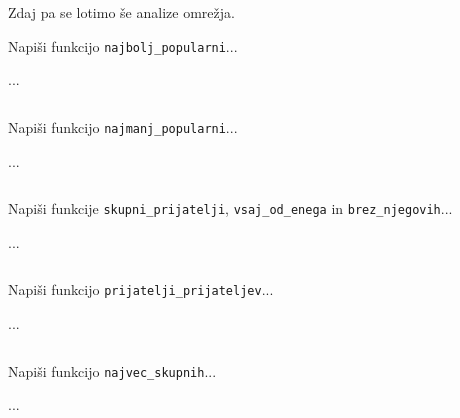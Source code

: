 Zdaj pa se lotimo še analize omrežja.

\begin{zgled}
Napiši funkcijo \texttt{najbolj\_popularni}...
\end{zgled}
\begin{resitev}
...
\begin{lstlisting}[language=Python,numbers=left]

\end{lstlisting}
\end{resitev}

\begin{zgled}
Napiši funkcijo \texttt{najmanj\_popularni}...
\end{zgled}
\begin{resitev}
...
\begin{lstlisting}[language=Python,numbers=left]

\end{lstlisting}
\end{resitev}

\begin{zgled}
Napiši funkcije \texttt{skupni\_prijatelji}, \texttt{vsaj\_od\_enega} in \texttt{brez\_njegovih}...
\end{zgled}
\begin{resitev}
...
\begin{lstlisting}[language=Python,numbers=left]

\end{lstlisting}
\end{resitev}


\begin{zgled}
Napiši funkcijo \texttt{prijatelji\_prijateljev}...
\end{zgled}
\begin{resitev}
...
\begin{lstlisting}[language=Python,numbers=left]

\end{lstlisting}
\end{resitev}


\begin{zgled}
Napiši funkcijo \texttt{najvec_skupnih}...
\end{zgled}
\begin{resitev}
...
\begin{lstlisting}[language=Python,numbers=left]

\end{lstlisting}
\end{resitev}
